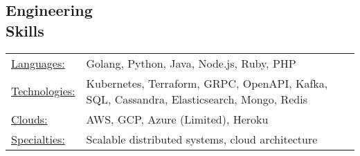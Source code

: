 \documentclass[margin]{res}
\begin{document}
\begin{resume}
\section{Engineering \\ Skills}
   \begin{tabular}{l p{3in}}
    \underline{Languages:} & %
    Golang, Python, Java, Node.js, Ruby, PHP \\
    \underline{Technologies:} & Kubernetes, 
    Terraform,
    GRPC,
    OpenAPI,
    Kafka,
    SQL,
    Cassandra,
    Elasticsearch,
    Mongo,
    Redis \\
\underline{Clouds:} & AWS, GCP, Azure (Limited),
Heroku \\
\underline{Specialties:} & Scalable distributed systems, cloud architecture
\end{tabular}



\end{resume}
\end{document}
